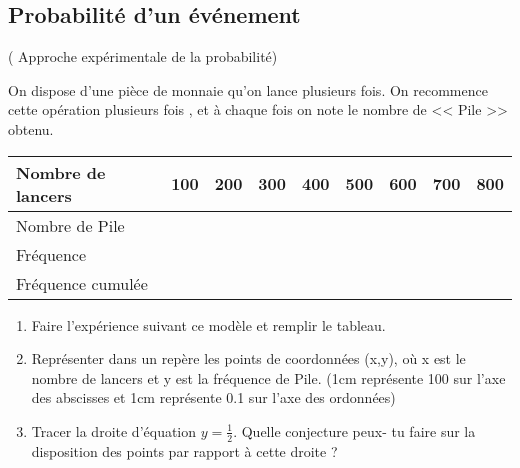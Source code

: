 \subsection{Probabilité d’un événement}
  ( Approche expérimentale de la probabilité)
  \begin{lemma}
On dispose d’une pièce de monnaie qu’on lance plusieurs fois. On recommence cette opération plusieurs fois , et à chaque fois on note le nombre de << Pile >> obtenu.




\begin{tabularx}{\textwidth}{|X|X|X|X|X|X|X|X|X|}
\hline
 Nombre de  lancers & 100 & 200 & 300 & 400 & 500 & 600 & 700 & 800 \\ \hline
Nombre de Pile & &&&&&&& \\ \hline
Fréquence & &&&&&&&\\ \hline
Fréquence cumulée &&&&&&&& \\ \hline
\end{tabularx}

\begin{enumerate}
\item Faire l'expérience suivant ce modèle  et remplir le tableau.
\item Représenter dans un repère les points de coordonnées (x,y), où x est le nombre de lancers et y est la fréquence de Pile.\; (1cm  représente 100 sur l'axe des abscisses  et 1cm représente 0.1 sur l'axe des ordonnées)
\item Tracer la droite d’équation $ y=\frac{1}{2} $.\; Quelle conjecture peux- tu faire sur la disposition des points par rapport à cette droite ? 
 
\end{enumerate}
\end{lemma}
